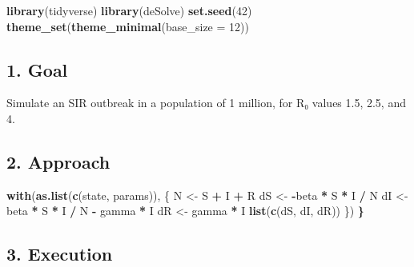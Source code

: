 \documentclass[
]{article}
\newenvironment{Shaded}{\begin{snugshade}}{\end{snugshade}}
\newcommand{\AttributeTok}[1]{\textcolor[rgb]{0.13,0.29,0.53}{#1}}
\newcommand{\DecValTok}[1]{\textcolor[rgb]{0.00,0.00,0.81}{#1}}
\newcommand{\ErrorTok}[1]{\textcolor[rgb]{0.64,0.00,0.00}{\textbf{#1}}}
\newcommand{\FunctionTok}[1]{\textcolor[rgb]{0.13,0.29,0.53}{\textbf{#1}}}
\newcommand{\NormalTok}[1]{#1}
\newcommand{\OtherTok}[1]{\textcolor[rgb]{0.56,0.35,0.01}{#1}}
\newcommand{\SpecialCharTok}[1]{\textcolor[rgb]{0.81,0.36,0.00}{\textbf{#1}}}
\begin{document}
\begin{Shaded}
\begin{Highlighting}[]
\FunctionTok{library}\NormalTok{(tidyverse)}
\FunctionTok{library}\NormalTok{(deSolve)}
\FunctionTok{set.seed}\NormalTok{(}\DecValTok{42}\NormalTok{)}
\FunctionTok{theme\_set}\NormalTok{(}\FunctionTok{theme\_minimal}\NormalTok{(}\AttributeTok{base\_size =} \DecValTok{12}\NormalTok{))}
\end{Highlighting}
\end{Shaded}

\subsection{1. Goal}\label{goal}

Simulate an SIR outbreak in a population of 1 million, for R₀ values
1.5, 2.5, and 4.

\subsection{2. Approach}\label{approach}

\begin{Shaded}
\begin{Highlighting}[]
  \FunctionTok{with}\NormalTok{(}\FunctionTok{as.list}\NormalTok{(}\FunctionTok{c}\NormalTok{(state, params)), \{}
\NormalTok{    N  }\OtherTok{\textless{}{-}}\NormalTok{ S }\SpecialCharTok{+}\NormalTok{ I }\SpecialCharTok{+}\NormalTok{ R}
\NormalTok{    dS }\OtherTok{\textless{}{-}} \SpecialCharTok{{-}}\NormalTok{beta }\SpecialCharTok{*}\NormalTok{ S }\SpecialCharTok{*}\NormalTok{ I }\SpecialCharTok{/}\NormalTok{ N}
\NormalTok{    dI }\OtherTok{\textless{}{-}}\NormalTok{  beta }\SpecialCharTok{*}\NormalTok{ S }\SpecialCharTok{*}\NormalTok{ I }\SpecialCharTok{/}\NormalTok{ N }\SpecialCharTok{{-}}\NormalTok{ gamma }\SpecialCharTok{*}\NormalTok{ I}
\NormalTok{    dR }\OtherTok{\textless{}{-}}\NormalTok{  gamma }\SpecialCharTok{*}\NormalTok{ I}
    \FunctionTok{list}\NormalTok{(}\FunctionTok{c}\NormalTok{(dS, dI, dR))}
\NormalTok{  \})}
\ErrorTok{\}}
\end{Highlighting}
\end{Shaded}

\subsection{3. Execution}\label{execution}
\end{document}
